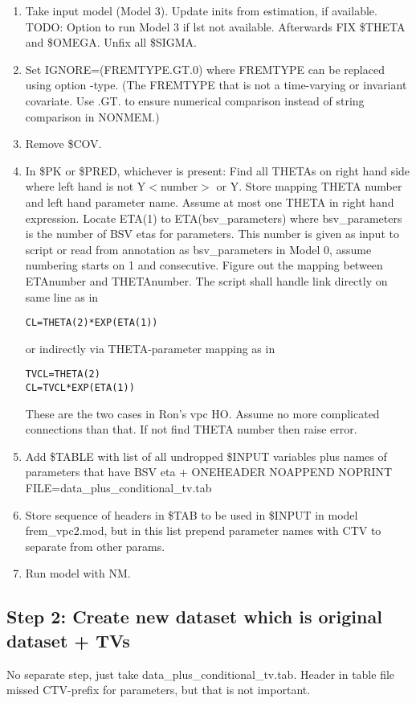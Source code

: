 \begin{enumerate}
	\item Take input model (Model 3). Update inits from estimation, if available. TODO: Option to run Model 3 if lst not available. Afterwards FIX \$THETA and \$OMEGA. Unfix all \$SIGMA.
	\item Set IGNORE=(FREMTYPE.GT.0) where FREMTYPE can be replaced using option -type.
(The FREMTYPE that is not a time-varying or invariant covariate. Use .GT. to ensure numerical comparison instead of string comparison in NONMEM.)
	\item Remove \$COV.
	\item In \$PK or \$PRED, whichever is present: 
Find all THETAs on right hand side where left hand is not Y$<$number$>$ or Y. Store mapping THETA number and left hand parameter name. Assume at most one THETA in right hand expression.  
Locate ETA(1) to ETA(bsv\_parameters) where bsv\_parameters is the number of BSV etas for parameters. This number is given as input to script or read from annotation as bsv\_parameters in Model 0, assume numbering starts on 1 and consecutive. Figure out the mapping between ETAnumber and THETAnumber. The script shall handle link directly on same line as in 
\begin{verbatim}
CL=THETA(2)*EXP(ETA(1))
\end{verbatim} 
or indirectly via THETA-parameter mapping as in 
\begin{verbatim}
TVCL=THETA(2)
CL=TVCL*EXP(ETA(1))
\end{verbatim}  
These are the two cases in Ron's vpc HO. Assume no more complicated connections than that. If not find THETA number then raise error.
	\item Add \$TABLE with list of all undropped \$INPUT variables plus names of parameters that have BSV eta  + ONEHEADER NOAPPEND NOPRINT FILE=data\_plus\_conditional\_tv.tab
	\item Store sequence of headers in \$TAB to be used in \$INPUT in model frem\_vpc2.mod, but in this list prepend parameter names with CTV to separate from other params.
	\item Run model with NM.
\end{enumerate}

\subsection{Step 2: Create new dataset which is original dataset + TVs}
No separate step, just take data\_plus\_conditional\_tv.tab. Header in table file missed CTV-prefix for parameters, but that is not important.

